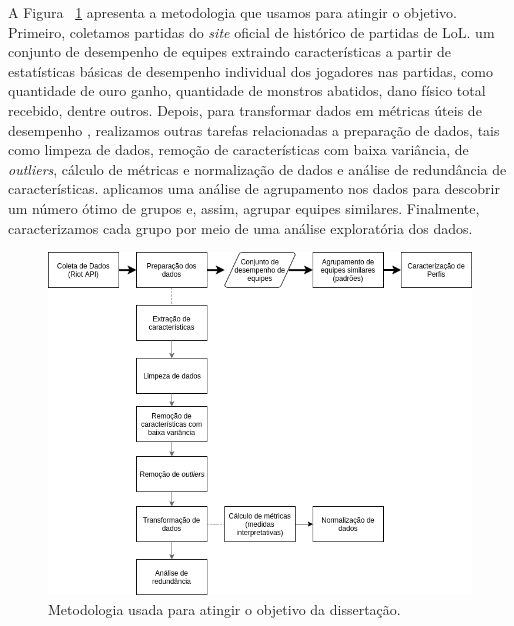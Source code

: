 A Figura ~\ref{fig:metodologia} apresenta a metodologia que usamos para atingir o objetivo. Primeiro, coletamos partidas do \textit{site} oficial de histórico de partidas de LoL.  um conjunto  de desempenho de equipes extraindo características a partir de estatísticas básicas de desempenho individual dos jogadores nas partidas, como quantidade de ouro ganho, quantidade de monstros abatidos, dano físico total recebido, dentre outros. Depois, para transformar  dados em métricas úteis de desempenho , realizamos outras tarefas relacionadas a preparação de dados, tais como limpeza de dados, remoção de características com baixa variância,  de \textit{outliers}, cálculo de métricas e normalização de dados e análise de redundância de características.  aplicamos uma análise de agrupamento  nos dados   para descobrir um número ótimo de grupos e, assim, agrupar equipes similares. Finalmente, caracterizamos cada grupo por meio de uma análise exploratória dos dados. 

\begin{figure}
  \centering
  \includegraphics[width=1.0\textwidth]{metodologia}%
  \caption{Metodologia usada para atingir o objetivo da dissertação.}
  \label{fig:metodologia}
\end{figure}

